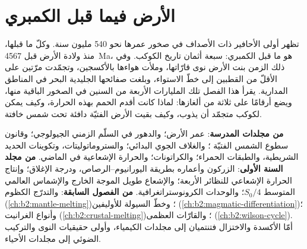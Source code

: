 \chapter{الأرض فيما قبل الكمبري}\label{ch:b2:precambrian-earth}

تظهر أولى الأحافير ذات الأصداف في صخور عمرها نحو 540 مليون سنة. وكلّ ما قبلها، منذ
ولادة الأرض قبل \qty{4567}{Ma}، هو ما قبل الكمبري: سبعة أثمان تاريخ
الكوكب. وفي ذلك الزمن بنت الأرض نوى قارّاتها، وملأت هواءها بالأكسجين،
وتجمّدت مرّتين على الأقلّ من القطبين إلى خطّ الاستواء، وبلغت صفائحها الجليدية البحر
في المناطق المدارية. يقرأ هذا الفصل تلك المليارات الأربعة من السنين في الصخور الباقية منها،
ويضع أرقامًا على ثلاثة من ألغازها: لماذا كانت أقدم الحمم بهذه الحرارة، وكيف يمكن لكوكب
متجمّد أن يذوب، وكيف بقيت الأرض الفتيّة دافئة تحت شمس خافتة.

\begin{recall}
\textbf{من مجلدات المدرسة}: عمر الأرض؛ والدهور في السلّم الزمني الجيولوجي؛
وقانون سطوع الشمس الفتيّة ؛ والغلاف الجوي البدائي؛
والستروماتوليتات، وتكوينات الحديد الشريطية،  والطبقات الحمراء؛ والكراتونات؛
والحرارة الإشعاعية في الماضي. \textbf{من مجلد السنة الأولى}: الزركون وأعماره بطريقة اليورانيوم--الرصاص،
ودرجة الإغلاق؛ وإنتاج الحرارة الإشعاعي للنظائر الأربعة؛ والإشعاع طويل الموجة الخارج
والإشماس العالمي المتوسط $S_0/4$؛ والوحدات الكرونوستراتغرافية.
\textbf{من الفصول السابقة}:  والتدرّج الكظوم
(\cref{ch:b2:mantle-melting})؛ وخطّ السيولة  للأوليفين
(\cref{ch:b2:magmatic-differentiation})؛ وأنواع الغرانيت (\cref{ch:b2:crustal-melting})؛
والقارّات العظمى (\cref{ch:b2:wilson-cycle}). أمّا الأكسدة والاختزال فتنتميان إلى مجلدات
الكيمياء، وأولى حقيقيات النوى والتركيب الضوئي إلى مجلدات الأحياء.
\end{recall}


